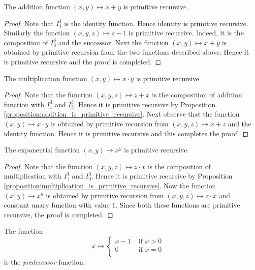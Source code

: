 \documentclass[10pt]{amsart}
\begin{document}
\begin{proposition}\label{proposition:addition_is_primitive_recursive}
	The addition function $(x,y) \mapsto x + y$ is primitive recursive.
\end{proposition}
\begin{proof}
	Note that $I^1_1$ is the identity function. Hence identity is primitive recursive. Similarly the function $(x,y,z) \mapsto z + 1$ is primitive recursive. Indeed, it is the composition of $I^3_3$ and the successor. Next the function $(x,y) \mapsto x + y$ is obtained by primitive recursion from the two functions described above. Hence it is primitive recursive and the proof is completed.
\end{proof}

\begin{proposition}\label{proposition:multiplication_is_primitive_recursive}
	The multiplication function $(x,y) \mapsto x\cdot y$ is primitive recursive.
\end{proposition}
\begin{proof}
	Note that the function $(x,y,z)\mapsto z + x$ is the composition of addition function with $I^3_1$ and $I^3_3$. Hence it is primitive recursive by Proposition \ref{proposition:addition_is_primitive_recursive}. Next observe that the function $(x,y)\mapsto x\cdot y$ is obtained by primitive recursion from $(x,y,z) \mapsto x + z$ and the identity function. Hence it is primitive recursive and this completes the proof.
\end{proof}

\begin{proposition}\label{proposition:power_function_is_primitive_recursive}
	The exponential function $(x,y) \mapsto x^y$ is primitive recursive.
\end{proposition}
\begin{proof}
	Note that the function $(x,y,z) \mapsto z\cdot x$ is the composition of multiplication with $I^3_1$ and $I^3_3$. Hence it is primitive recursive by Proposition \ref{proposition:multiplication_is_primitive_recursive}. Now the function $(x, y) \mapsto x^y$ is obtained by primitive recursion from $(x,y,z) \mapsto z\cdot x$ and constant unary function with value $1$. Since both these functions are primitive recursive, the proof is completed.
\end{proof}

\begin{definition}
	The function
	$$x \mapsto \begin{cases}
			x - 1 & \mbox{ if }x > 0 \\
			0     & \mbox{ if }x = 0 \\
		\end{cases}$$
	is the \textit{predecessor} function.
\end{definition}
\end{document}
